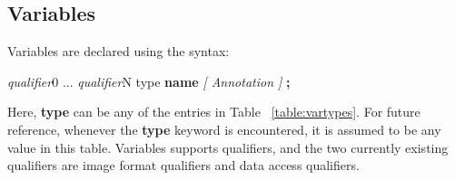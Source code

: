 \documentclass{article}
\newcommand{\SyntaxBox}[1]
{	
	\begin{center}
	\colorbox{orange!60}
	{
		\begin{minipage}{\linewidth}
		\hfill
		\begin{tabbing}
		#1
		\end{tabbing}
		\end{minipage}
	}
	\end{center}
}
\begin{document}
\subsection{Variables}

Variables are declared using the syntax:

\SyntaxBox
{
	\textit{qualifier}0 ... \textit{qualifier}N type \textbf{name} \textit{[ Annotation ]} \textbf{;}
}

Here, \textbf{type} can be any of the entries in Table ~\ref{table:vartypes}. For future reference, whenever the \textbf{type} keyword is encountered, it is assumed to be any value in this table. Variables supports qualifiers, and the two currently existing qualifiers are image format qualifiers and data access qualifiers. 

\clearpage
\begin{table}[hp]
\centering
\caption{Variable types}
\label{table:vartypes}
\end{table}
\end{document}
